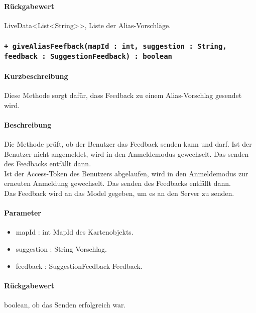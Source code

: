 \paragraph*{Rückgabewert}
LiveData<List<String>>, Liste der Alias-Vorschläge.

\subsubsection{\texttt{+ giveAliasFeefback(mapId : int, suggestion : String, feedback : SuggestionFeedback) : boolean}}%
\paragraph*{Kurzbeschreibung}
Diese Methode sorgt dafür, dass Feedback zu einem Alias-Vorschlag gesendet wird.
\paragraph*{Beschreibung}
Die Methode prüft, ob der Benutzer das Feedback senden kann und darf.
Ist der Benutzer nicht angemeldet, wird in den Anmeldemodus gewechselt. Das senden des Feedbacks entfällt dann.\\
Ist der Access-Token des Benutzers abgelaufen, wird in den Anmeldemodus zur erneuten Anmeldung gewechselt. Das senden des Feedbacks entfällt dann.\\
Das Feedback wird an das Model gegeben, um es an den Server zu senden.
\paragraph*{Parameter}
\begin{itemize}
    \item mapId : int MapId des Kartenobjekts.
    \item suggestion : String Vorschlag. 
    \item feedback : SuggestionFeedback Feedback.
\end{itemize}
\paragraph*{Rückgabewert}
boolean, ob das Senden erfolgreich war.